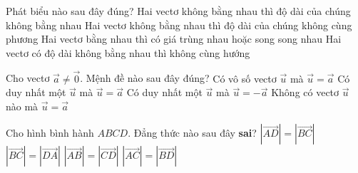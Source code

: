 \begin{ex}%
	Phát biểu nào sau đây đúng?
	\choice
	{Hai vectơ không bằng nhau thì độ dài của chúng không bằng nhau}
	{Hai vectơ không bằng nhau thì độ dài của chúng không cùng phương}
	{\True Hai vectơ bằng nhau thì có giá trùng nhau hoặc song song nhau}
	{Hai vectơ có độ dài không bằng nhau thì không cùng hướng}
\end{ex}




\begin{ex}%
	Cho vectơ $ \overrightarrow{a} \ne \overrightarrow{0} $. Mệnh đề nào sau đây đúng?
	\choice
	{\True Có vô số vectơ $ \overrightarrow{u} $ mà $ \overrightarrow{u}=\overrightarrow{a} $}
	{Có duy nhất một $ \overrightarrow{u} $ mà $ \overrightarrow{u}=\overrightarrow{a} $}
	{Có duy nhất một $ \overrightarrow{u} $ mà $ \overrightarrow{u}=-\overrightarrow{a} $}
	{Không có vectơ $ \overrightarrow{u} $ nào mà $ \overrightarrow{u}=\overrightarrow{a} $}
\end{ex}

\begin{ex}%
	Cho hình bình hành $ABCD$. Đẳng thức nào sau đây \textbf{sai}?
	\choice
	{$\left|\overrightarrow{AD}\right|=\left|\overrightarrow{BC}\right|$}
	{$\left|\overrightarrow{BC}\right|=\left|\overrightarrow{DA}\right|$}
	{$\left|\overrightarrow{AB}\right|=\left|\overrightarrow{CD}\right|$}
	{\True $\left|\overrightarrow{AC}\right|=\left|\overrightarrow{BD}\right|$}
\end{ex}

